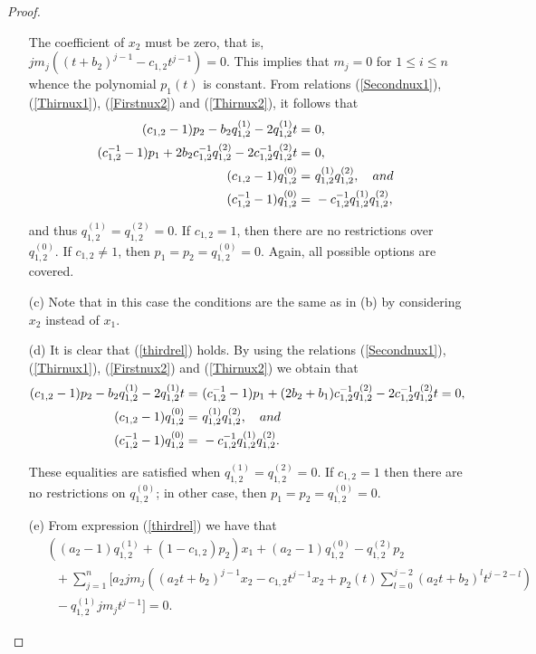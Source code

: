 \documentclass{amsart}
\theoremstyle{definition}
\theoremstyle{remark}
\numberwithin{equation}{section}
\begin{document}
\begin{proof}
\begin{enumerate}
The coefficient of $x_2$ must be zero, that is, $jm_j((t+b_2)^{j-1}-c_{1,2}t^{j-1}) = 0$. This implies that $m_j=0$ for $1 \leq i \leq n$ whence the polynomial $p_1(t)$ is constant. From relations {\rm (}\ref{Secondnux1}{\rm )}, {\rm (}\ref{Thirnux1}{\rm )}, {\rm (}\ref{Firstnux2}{\rm )} and {\rm (}\ref{Thirnux2}{\rm )}, it follows that
\begin{align*}
     (c_{1,2}-1)p_2-b_2q_{1,2}^{(1)}-2q_{1,2}^{(1)}t = &\ 0, \\
(c_{1,2}^{-1}-1)p_1+2b_2c_{1,2}^{-1}q_{1,2}^{(2)}-2c_{1,2}^{-1}q_{1,2}^{(2)}t = &\ 0, \\
(c_{1,2}-1)q_{1,2}^{(0)} = &\ q_{1,2}^{(1)}q_{1,2}^{(2)}, \quad {\rm and} \\
(c_{1,2}^{-1}-1)q_{1,2}^{(0)} = &\ -c_{1,2}^{-1}q_{1,2}^{(1)}q_{1,2}^{(2)},
\end{align*}

and thus $q_{1,2}^{(1)}=q_{1,2}^{(2)}=0$. If $c_{1,2}=1$, then there are no restrictions over $q_{1,2}^{(0)}$. If $c_{1,2}\not=1$, then $p_1=p_2=q_{1,2}^{(0)}=0$. Again, all possible options are covered.

    \item [\rm (c)] Note that in this case the conditions are the same as in (b) by considering $x_2$ instead of $x_1$.
    
    \item [\rm (d)] It is clear that (\ref{thirdrel}) holds. By using the relations {\rm (}\ref{Secondnux1}{\rm )}, {\rm (}\ref{Thirnux1}{\rm )}, {\rm (}\ref{Firstnux2}{\rm )} and  {\rm (}\ref{Thirnux2}{\rm )} we obtain that
    \begin{align*}
        (c_{1,2}-1)p_2-b_2q_{1,2}^{(1)}-2q_{1,2}^{(1)}t = &\ (c_{1,2}^{-1}-1)p_1+(2b_2+b_1)c_{1,2}^{-1}q_{1,2}^{(2)}-2c_{1,2}^{-1}q_{1,2}^{(2)}t = 0, \\
        (c_{1,2}-1)q_{1,2}^{(0)} = &\ q_{1,2}^{(1)}q_{1,2}^{(2)}, \quad{\rm and} \\
        (c_{1,2}^{-1}-1)q_{1,2}^{(0)} = &\ - c_{1,2}^{-1}q_{1,2}^{(1)}q_{1,2}^{(2)}.
    \end{align*}
    
These equalities are satisfied when $q_{1,2}^{(1)}=q_{1,2}^{(2)}=0$. If $c_{1,2}=1$ then there are no restrictions on $q_{1,2}^{(0)}$; in other case, then $p_1=p_2=q_{1,2}^{(0)}=0$.
    \item [\rm (e)] From expression (\ref{thirdrel}) we have that 
    \begin{align*}
        &\ ((a_2-1)q_{1,2}^{(1)}+(1-c_{1,2})p_2)x_1 + (a_2-1)q_{1,2}^{(0)}-q_{1,2}^{(2)}p_2 \\
        &\ \ \ \ +\sum_{j=1}^n [ a_2jm_j\left(\left(a_2t+b_2\right)^{j-1}x_2-c_{1,2}t^{j-1}x_2 +p_2(t)\sum_{l=0}^{j-2}(a_2t+b_2)^{l}t^{j-2-l}\right) \\
        &\ \ \ \ - q_{1,2}^{(1)}jm_jt^{j-1}] = 0.
    \end{align*}


\end{enumerate}
\end{proof}
\end{document}

